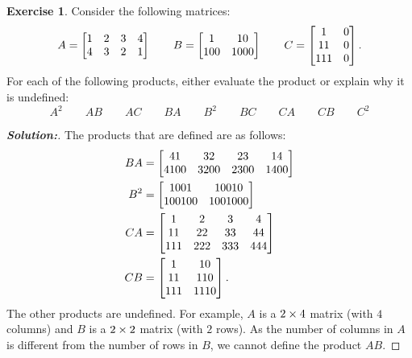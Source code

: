 \documentclass[a4paper]{amsart}
\theoremstyle{definition}
\newtheorem{exercise}{Exercise}
\newenvironment{solution}{\begin{proof}[\textbf{Solution:}] \vphantom{u}}{\end{proof}}
\begin{document}
\begin{exercise}\label{ex-mat-prod-ii}
 Consider the following matrices:
 \[ A = \left[\begin{matrix} 1&2&3&4 \\ 4&3&2&1 \end{matrix}\right] \qquad
    B = \left[\begin{matrix} 1 & 10 \\ 100 & 1000 \end{matrix}\right] \qquad
    C = \left[\begin{matrix} 1 & 0 \\ 11 & 0 \\ 111 & 0 \end{matrix}\right].
 \]
 For each of the following products, either evaluate the product or
 explain why it is undefined:
 \[ A^2 \qquad AB \qquad AC \qquad
    BA \qquad B^2 \qquad BC \qquad
    CA \qquad CB \qquad C^2
 \]
\end{exercise}
\begin{solution}
 The products that are defined are as follows:
 \begin{align*}
  BA &= \left[\begin{matrix} 41 & 32 & 23 & 14 \\ 4100 & 3200 & 2300 & 1400 \end{matrix}\right] \\
  B^2 &= \left[\begin{matrix} 1001 & 10010 \\ 100100 & 1001000 \end{matrix}\right] \\
  CA &= \left[\begin{matrix} 1 & 2 & 3 & 4 \\
             11 & 22 & 33 & 44 \\
             111 & 222 & 333 & 444 \end{matrix}\right] \\
  CB &= \left[\begin{matrix} 1 & 10 \\ 11 & 110 \\ 111 & 1110 \end{matrix}\right].
 \end{align*}
 The other products are undefined.  For example, $A$ is a $2\times 4$
 matrix (with $4$ columns) and $B$ is a $2\times 2$ matrix (with $2$
 rows).  As the number of columns in $A$ is different from the number
 of rows in $B$, we cannot define the product $AB$.  
\end{solution}
\end{document}
